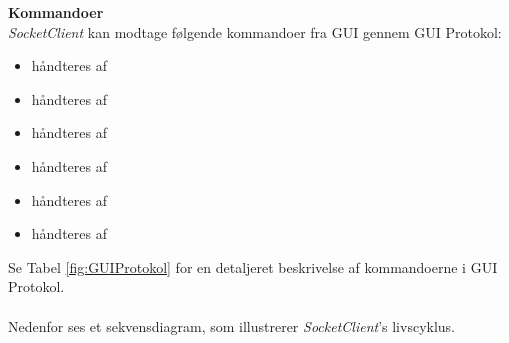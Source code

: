 \textbf{Kommandoer}\\

\textit{SocketClient} kan modtage følgende kommandoer fra GUI gennem GUI Protokol:

\begin{itemize}
\item {} håndteres af 
\item {} håndteres af 
\item {} håndteres af 
\item {} håndteres af 
\item {} håndteres af 
\item {} håndteres af 
\end{itemize}

Se Tabel \ref{fig:GUIProtokol} for en detaljeret beskrivelse af kommandoerne i GUI Protokol.\\\\

Nedenfor ses et sekvensdiagram, som illustrerer \textit{SocketClient}'s livscyklus.

